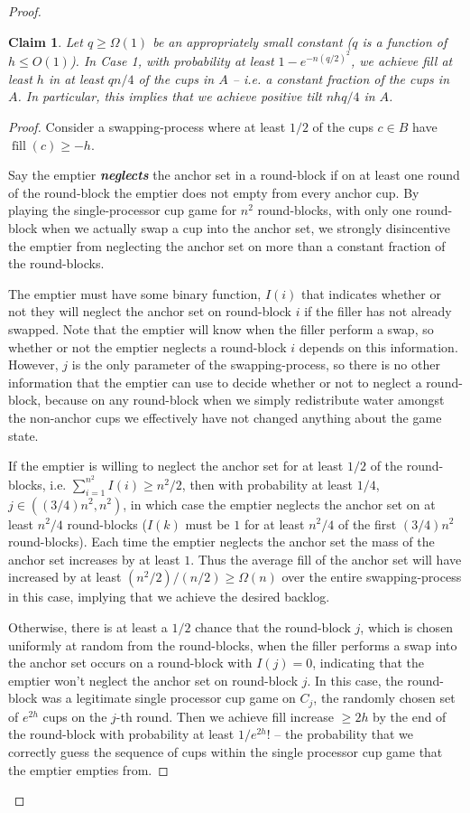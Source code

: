 \documentclass[twocolumn]{article}[10pt]
\newcommand{\defn}[1]{{\textit{\textbf{\boldmath #1}}}\xspace}
\DeclareMathOperator{\fil}{\text{fill}}
\newtheorem{clm}{Claim}
\begin{document}
\begin{proof}
\begin{clm} \label{clm:reg} 
  Let $q\ge \Omega(1)$ be an appropriately small constant ($q$ is a function of
  $h\le O(1)$). In Case 1, with probability at least $1-e^{-n(q/2)^2}$, we
  achieve fill at least $h$ in at least $qn/4$ of the cups in $A$ -- i.e. a
  constant fraction of the cups in $A$. In particular, this implies that we
  achieve positive tilt $nhq/4$ in $A$.
\end{clm}
\begin{proof}
  Consider a swapping-process where at least $1/2$ of the cups $c \in B$
  have $\fil(c) \ge -h$.

  Say the emptier \defn{neglects} the anchor set in a round-block if on at
  least one round of the round-block the emptier does not empty from every
  anchor cup. By playing the single-processor cup game for $n^2$ round-blocks,
  with only one round-block when we actually swap a cup into the anchor set, we
  strongly disincentive the emptier from neglecting the anchor set on more
  than a constant fraction of the round-blocks. 

  The emptier must have some binary function, $I(i)$ that indicates whether or
  not they will neglect the anchor set on round-block $i$ if the filler has not
  already swapped. Note that the emptier will know when the filler perform a
  swap, so whether or not the emptier neglects a round-block $i$ depends on
  this information. However, $j$ is the only parameter of the swapping-process,
  so there is no other information that the emptier can use to decide whether
  or not to neglect a round-block, because on any round-block when we simply
  redistribute water amongst the non-anchor cups we effectively have not
  changed anything about the game state. 

  If the emptier is willing to neglect the anchor set for at least $1/2$ of the
  round-blocks, i.e. $\sum_{i=1}^{n^2} I(i) \ge n^2 / 2$, then with probability
  at least $1/4$, $j \in ((3/4) n^2, n^2)$, in which case the emptier neglects
  the anchor set on at least $n^2/4$ round-blocks ($I(k)$ must be $1$ for at
  least $n^2/4$ of the first $(3/4)n^2$ round-blocks). Each time the emptier
  neglects the anchor set the mass of the anchor set increases by at least $1$.
  Thus the average fill of the anchor set will have increased by at least
  $(n^2/2)/(n/2) \ge \Omega(n)$ over the entire swapping-process in this
  case, implying that we achieve the desired backlog. 

  Otherwise, there is at least a $1/2$ chance that the round-block $j$, which
  is chosen uniformly at random from the round-blocks, when the filler performs
  a swap into the anchor set occurs on a round-block with $I(j)=0$, indicating
  that the emptier won't neglect the anchor set on round-block $j$. In this
  case, the round-block was a legitimate single processor cup game on $C_j$,
  the randomly chosen set of $e^{2h}$ cups on the $j$-th round. Then we achieve
  fill increase $\ge 2h$ by the end of the round-block with probability at
  least $1/e^{2h}!$ -- the probability that we correctly guess the sequence of
  cups within the single processor cup game that the emptier empties from. 


\end{proof}
\end{proof}
\end{document}
